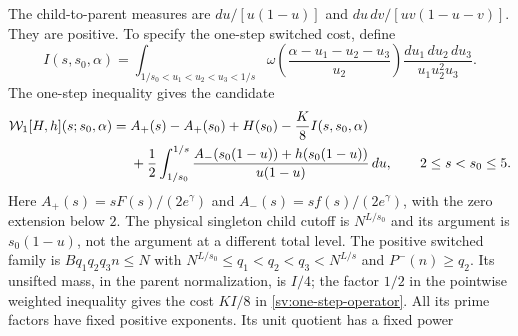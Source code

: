 
The child-to-parent measures are
$du/[u(1-u)]$ and $du\,dv/[uv(1-u-v)]$.
They are positive.  To specify the one-step switched cost, define
\begin{equation}\label{sv:one-step-mass}
 I(s,s_0,\alpha)=
 \int_{1/s_0<u_1<u_2<u_3<1/s}
 \omega\!\left(\frac{\alpha-u_1-u_2-u_3}{u_2}\right)
                    \frac{du_1\,du_2\,du_3}{u_1u_2^2u_3}.
\end{equation}
The one-step inequality gives the candidate
\begin{align}\label{sv:one-step-operator}
 \mathcal W_1[H,h](s;s_0,\alpha)
 ={}&A_+(s)-A_+(s_0)+H(s_0)-\frac K8 I(s,s_0,\alpha)\notag\\
 &+\frac12\int_{1/s_0}^{1/s}
 \frac{A_-(s_0(1-u))+h(s_0(1-u))}{u(1-u)}\,du,
 \qquad 2\le s<s_0\le5.
\end{align}
Here $A_+(s)=sF(s)/(2e^\gamma)$ and
$A_-(s)=sf(s)/(2e^\gamma)$, with the zero extension below
$2$.  The physical singleton child cutoff is $N^{L/s_0}$ and its
argument is $s_0(1-u)$, not the argument at a different total level.
The positive switched family is
$Bq_1q_2q_3n\le N$ with
$N^{L/s_0}\le q_1<q_2<q_3<N^{L/s}$ and $P^-(n)\ge q_2$.
Its unsifted mass, in the parent normalization, is $I/4$; the
factor $1/2$ in the pointwise weighted inequality gives the cost
$KI/8$ in \eqref{sv:one-step-operator}.  All its prime factors
have fixed positive exponents.  Its unit quotient has a fixed power
